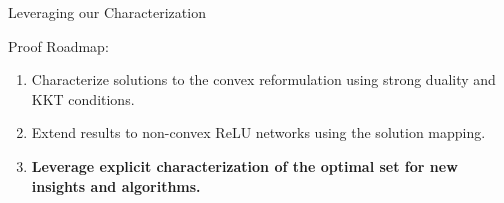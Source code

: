 \documentclass[usenames,dvipsnames,mathserif,notheorems]{beamer}
\newcommand{\bad}[1]{\textcolor{bad}{#1}}
\newcommand{\good}[1]{\textcolor{good}{#1}}
\begin{document}
\begin{frame}{Leveraging our Characterization}

	{\Large Proof Roadmap:}
	\vspace{2em}
	\pause

	\begin{enumerate}
		\large
		\item Characterize solutions to the \good{convex reformulation}
		      using strong duality and KKT conditions.
		      \vspace{1ex}

		\item Extend results to \bad{non-convex} ReLU networks
		      using the solution mapping.
		      \vspace{1ex}

		\item \textbf{Leverage explicit characterization of the optimal
			      set for \good{new insights and algorithms}.}
	\end{enumerate}
\end{frame}
\end{document}
